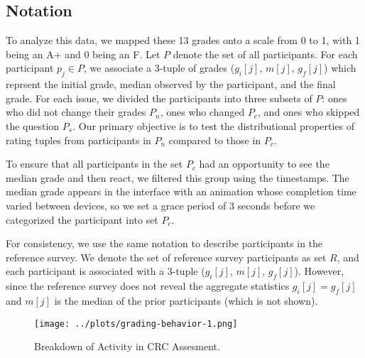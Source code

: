 \subsection{Notation}
To analyze this data, we mapped these 13 grades onto a scale from 0 to 1, with 1 being an A+ and 0 being an F.
Let $P$ denote the set of all participants.
For each participant $p_j\in P$, we associate a 3-tuple of grades ($g_i[j]$, $m[j]$, $g_f[j]$) which reprsent the initial grade, median observed by the participant, and the final grade.
For each issue, we divided the participants into three subsets of $P$: ones who did not change their grades $P_n$, ones who changed $P_c$, and ones who skipped the question $P_s$.
Our primary objective is to test the distributional properties of rating tuples from participants in $P_n$ compared to those in $P_c$.

To ensure that all participants in the set $P_c$ had an opportunity to see the median grade and then react, we filtered this group using the timestamps. 
The median grade appears in the interface with an animation whose completion time varied between devices, so we set a grace period of 3 seconds before 
we categorized the participant into set $P_c$.  

For consistency, we use the same notation to describe participants in the reference survey. We denote the set of reference survey participants as set $R$, and each participant is associated with a 3-tuple ($g_i[j]$, $m[j]$, $g_f[j]$). However, since the reference survey does not reveal the aggregate statistics $g_i[j] = g_f[j]$  and $m[j]$ is the median of the prior participants (which is not shown).

\begin{figure}[h!]
  \centering
    \texttt{[image: ../plots/grading-behavior-1.png]}
      \caption{Breakdown of Activity in CRC Assesment.}
      \label{grading-2}
\end{figure}
